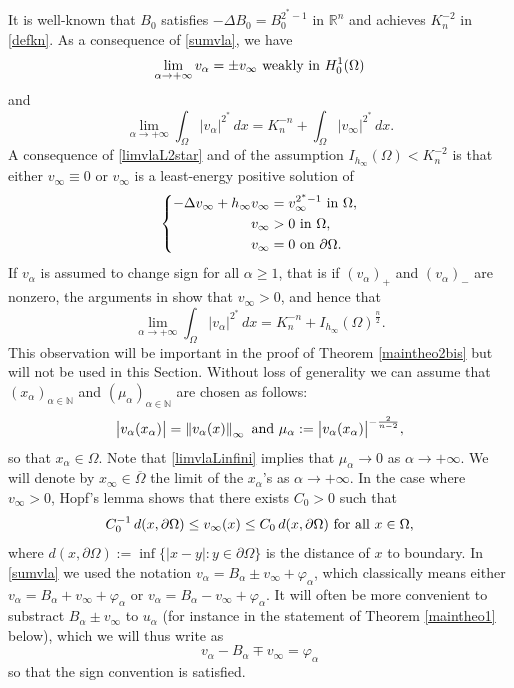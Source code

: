 \documentclass[10pt]{amsart}
\numberwithin{equation}{section}
\newcommand{\R}{\mathbb{R}}
\newcommand{\vp}{\varphi}
\newcommand{\Om}{\Omega}
\newcommand{\ua}{u_\alpha}
\newcommand{\ma}{\mu_\alpha}
\def \bb{\hbox}
\def \xl{x_\alpha}
\def \ma{\mu_{\alpha}}
\def \va{v_{\alpha}}
\def \hi{h_{\infty}}
\def \vo {v_{\infty}}
\def \nn{\mathbb{N}}
\theoremstyle{plain}
\theoremstyle{remark}
\begin{document}
It is well-known that $B_0$ satisfies $-\Delta B_0 = B_0^{2^*-1}$ in $\R^n$ and achieves $K_n^{-2}$ in \eqref{defkn}. As a consequence of \eqref{sumvla}, we have 
\begin{equation}\label{limitefaiblevla}
	\lim_{\alpha\to +\infty}\va= \pm \vo \bb{ weakly in } H_0^1(\Om)
\end{equation}
and 
$$\lim_{\alpha \to +\infty} \int_{\Om} |\va|^{2^*} \, dx =  K_n^{-n} + \int_{\Om} |\vo|^{2^*} \, dx. $$
A consequence of \eqref{limvlaL2star} and of the assumption $I_{\hi}(\Om)<K_n^{-2}$ is that either $v_\infty \equiv 0$ or $\vo$ is a least-energy positive solution of
\begin{equation}\label{critu0}
	\left\{\begin{aligned}
		-\Delta \vo +\hi \vo & =\vo^{2^*-1}\hbox{ in } \Omega, \\
		\vo&>0  \bb{ in }\Om,\\
		\vo&= 0  \hbox{ on } \partial \Omega.
	\end{aligned}\right.
\end{equation} 
If $\va$ is assumed to change sign for all $\alpha \ge 1$, that is if $(\va)_+$ and $(\va)_- $ are nonzero, the arguments in \cite[Lemma 3.1]{CeramiSoliminiStruwe} show that $\vo >0$, and hence that 
$$\lim_{\alpha \to +\infty} \int_{\Om} |\va|^{2^*} \, dx =  K_n^{-n} + I_{h_\infty}(\Om)^{\frac{n}{2}}. $$
This observation will be important in the proof of Theorem \ref{maintheo2bis} but will not be used in this Section. Without loss of generality we can assume that $(\xl)_{\alpha \in \nn}$ and $(\ma)_{\alpha \in \nn}$ are chosen as follows:
\begin{equation}\label{defma}
	\big| \va(\xl)\big| =\left\| \va(x)\right\|_{\infty} \bb{ and }\ma:=\big| \va(\xl)\big|^{-\frac{2}{n-2}},
\end{equation}
so that $\xl \in \Omega$. Note that \eqref{limvlaLinfini} implies that $\ma\to 0$ as $\alpha\to+\infty$. We will denote by $x_{\infty}\in \overline{\Om}$ the limit of the $x_{\alpha}$'s as $\alpha\to +\infty$. In the case where $v_\infty >0$, Hopf's lemma shows that there exists $C_0>0$ such that 
\begin{equation}\label{estu0}
	C_0^{-1}\,d(x,\partial\Om)\leq \vo(x)\leq C_0\, d(x,\partial\Om) \bb{ for all } x\in \Om,
\end{equation} 
where $d(x,\partial\Om):=\inf\{|x-y|: y\in\partial \Om\}$ is the distance of $x$ to boundary. In \eqref{sumvla} we used the notation $\va=B_{\alpha}\pm\vo+\vp_{\alpha}$, which classically means either $\va = B_\alpha + \vo + \vp_{\alpha}$ or $\va = B_\alpha - \vo + \vp_{\alpha}$. It will often be more convenient to substract $B_\alpha \pm \vo$ to $\ua$ (for instance in the statement of Theorem \ref{maintheo1} below), which we will thus write as 
$$ \va - B_\alpha \mp \vo = \vp_\alpha$$
so that the sign convention is satisfied. 
\end{document}

